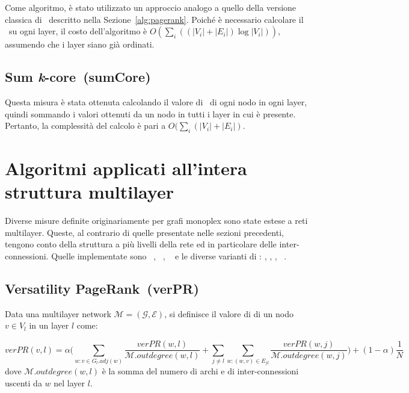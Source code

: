 Come algoritmo, è stato utilizzato un approccio analogo a quello della versione classica di 
\PageRank\ descritto nella Sezione~\vref{alg:pagerank}.
Poiché è necessario calcolare il \PageRank\ su ogni layer, il costo dell'algoritmo è 
$O(\sum_{i}((|V_i| + |E_i|)\log{|V_i|}))$, assumendo che i layer siano già ordinati.

\subsection{Sum \emph{k}-core~(sumCore)}
Questa misura è stata ottenuta calcolando il valore di \kcore\ di ogni nodo in 
ogni layer, quindi sommando i valori ottenuti da un nodo in tutti i layer in cui è presente.
Pertanto, la complessità del calcolo è pari a $O(\sum_{i}(|V_i| + |E_i|)$.

\section{Algoritmi applicati all'intera struttura multilayer}
Diverse misure definite originariamente per grafi monoplex sono state estese a 
reti multilayer. Queste, al contrario di quelle presentate nelle sezioni precedenti,
tengono conto della struttura a più livelli della rete ed in particolare delle inter-connessioni.
Quelle implementate sono 
\emph{\verPageRank}~\cite{dedomenico:versatile},
\emph{\verBetweennessCentrality}~\cite{dedomenico:versatile}\cite{dedomenico:verbetw},
\emph{\multiCore}~\cite{azimi:multikcore} e le diverse varianti di \emph{\PCI}: 
\emph{\mlPCI},
\emph{\laPCI},
\emph{\alPCI},
\emph{\lsPCI}~\cite{basaras:infspmul}.

\subsection{Versatility PageRank~(verPR)}
\begin{definizione}[\verPageRank]
    Data una multilayer network $\mathcal{M}=(\mathcal{G}, \mathcal{E})$,
    si definisce il valore di \mbox{\emph{\verPageRank}} di un nodo $v \in V_l$ in un layer $l$
    come:

    \begin{equation*}
        \mathit{verPR}(v, l) = 
        \alpha \biggl( 
            \sum_{w : v \in G_l.\mathit{adj}(w)} \frac{\mathit{verPR}(w, l)}{\mathcal{M}.\mathit{outdegree}(w, l)} +
            \sum_{j \neq l}^{}\sum_{w : (w, v) \in E_{jl}} \frac{\mathit{verPR}(w, j)}{\mathcal{M}.\mathit{outdegree}(w, j)} 
        \biggr) + (1-\alpha)\frac{1}{N}
    \end{equation*}
    dove $\mathcal{M}.\mathit{outdegree}(w, l)$ è la somma del numero di archi e di inter-connessioni uscenti da $w$ nel layer $l$.

\end{definizione}

